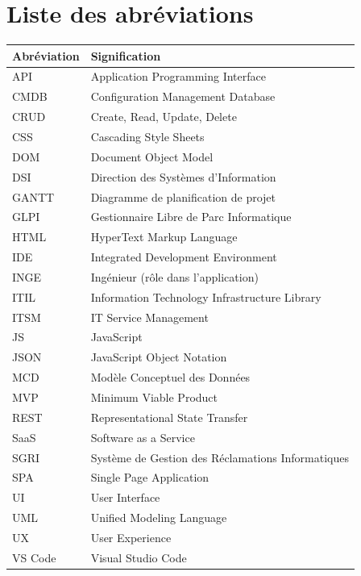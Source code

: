 \documentclass[12pt,a4paper,twoside]{report}
\begin{document}
\newpage
\listoftables
{}

\newpage
\listoffigures
{}

\chapter*{Liste des abréviations}

\begin{longtable}{p{3cm} p{10cm}}
    \toprule
    \textbf{Abréviation} & \textbf{Signification} \\
    \midrule
    \endhead
    
    API & Application Programming Interface \\
    CMDB & Configuration Management Database \\
    CRUD & Create, Read, Update, Delete \\
    CSS & Cascading Style Sheets \\
    DOM & Document Object Model \\
    DSI & Direction des Systèmes d'Information \\
    GANTT & Diagramme de planification de projet \\
    GLPI & Gestionnaire Libre de Parc Informatique \\
    HTML & HyperText Markup Language \\
    IDE & Integrated Development Environment \\
    INGE & Ingénieur (rôle dans l'application) \\
    ITIL & Information Technology Infrastructure Library \\
    ITSM & IT Service Management \\
    JS & JavaScript \\
    JSON & JavaScript Object Notation \\
    MCD & Modèle Conceptuel des Données \\
    MVP & Minimum Viable Product \\
    REST & Representational State Transfer \\
    SaaS & Software as a Service \\
    SGRI & Système de Gestion des Réclamations Informatiques \\
    SPA & Single Page Application \\
    UI & User Interface \\
    UML & Unified Modeling Language \\
    UX & User Experience \\
    VS Code & Visual Studio Code \\
    \bottomrule
\end{longtable}
\end{document}
